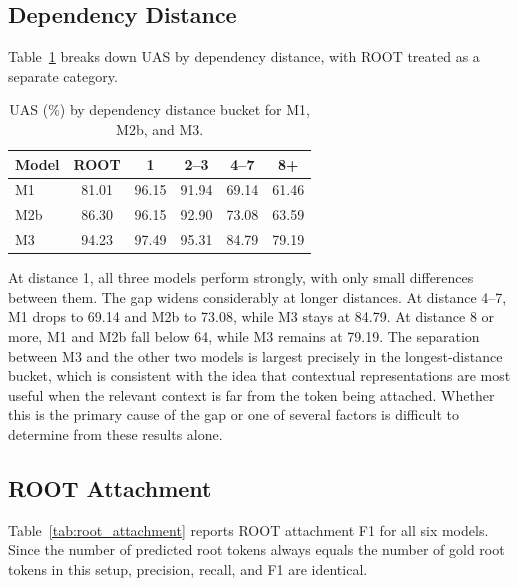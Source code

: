 \documentclass[12pt,letterpaper]{article}
\begin{document}
\subsection{Dependency Distance}
\label{subsec:distance}
Table~\ref{tab:dep_distance} breaks down UAS by dependency distance, with ROOT treated as a separate category.

\begin{table}[ht]
\centering
\caption{UAS (\%) by dependency distance bucket for M1, M2b, and M3.}
\label{tab:dep_distance}
\begin{tabular}{lccccc}
\toprule
\textbf{Model} & \textbf{ROOT} & \textbf{1} & \textbf{2--3} & \textbf{4--7} & \textbf{8+} \\
\midrule
M1  & 81.01 & 96.15 & 91.94 & 69.14 & 61.46 \\
M2b & 86.30 & 96.15 & 92.90 & 73.08 & 63.59 \\
M3  & 94.23 & 97.49 & 95.31 & 84.79 & 79.19 \\
\bottomrule
\end{tabular}
\end{table}
\FloatBarrier
At distance 1, all three models perform strongly, with only small differences between them. The gap widens considerably at longer distances. At distance 4--7, M1 drops to 69.14 and M2b to 73.08, while M3 stays at 84.79. At distance 8 or more, M1 and M2b fall below 64, while M3 remains at 79.19. The separation between M3 and the other two models is largest precisely in the longest-distance bucket, which is consistent with the idea that contextual representations are most useful when the relevant context is far from the token being attached. Whether this is the primary cause of the gap or one of several factors is difficult to determine from these results alone.\subsection{ROOT Attachment}
\label{subsec:root_attachment}

Table~\ref{tab:root_attachment} reports ROOT attachment F1 for all six models. Since the number of predicted root tokens always equals the number of gold root tokens in this setup, precision, recall, and F1 are identical.
\end{document}
